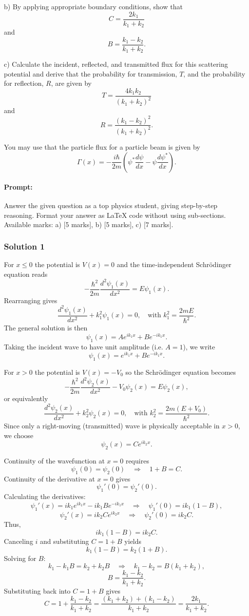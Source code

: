 \documentclass{article}
\begin{document}
b) By applying appropriate boundary conditions, show that
\[
C = \frac{2k_1}{k_1 + k_2}
\]
and
\[
B = \frac{k_1 - k_2}{k_1 + k_2}.
\]

c) Calculate the incident, reflected, and transmitted flux for this scattering potential and derive that the probability for transmission, $T$, and the probability for reflection, $R$, are given by
\[
T = \frac{4k_1k_2}{(k_1 + k_2)^2}
\]
and
\[
R = \frac{(k_1 - k_2)^2}{(k_1 + k_2)^2}.
\]

You may use that the particle flux for a particle beam is given by
\[
\Gamma(x) = -\frac{i\hbar}{2m} \left( \psi^* \frac{d\psi}{dx} - \psi \frac{d\psi^*}{dx} \right).
\]


\paragraph{Prompt: \\} 
Answer the given question as a top physics student, giving step-by-step reasoning. Format your answer as LaTeX code without using sub-sections. Available marks: a) [5 marks], b) [5 marks], c) [7 marks].

\subsubsection{Solution 1}
For \( x\le 0 \) the potential is \( V(x)=0 \) and the time‐independent Schrödinger equation reads
\[
-\frac{\hbar^2}{2m}\frac{d^2\psi_1(x)}{dx^2} = E\psi_1(x).
\]
Rearranging gives
\[
\frac{d^2\psi_1(x)}{dx^2} + k_1^2\psi_1(x)=0,\quad \text{with } k_1^2=\frac{2mE}{\hbar^2}.
\]
The general solution is then
\[
\psi_1(x)=Ae^{ik_1x}+Be^{-ik_1x}.
\]
Taking the incident wave to have unit amplitude (i.e. \(A=1\)), we write
\[
\psi_1(x)=e^{ik_1x}+Be^{-ik_1x}.
\]

For \( x>0 \) the potential is \( V(x)=-V_0 \) so the Schrödinger equation becomes
\[
-\frac{\hbar^2}{2m}\frac{d^2\psi_2(x)}{dx^2}-V_0\psi_2(x)=E\psi_2(x),
\]
or equivalently
\[
\frac{d^2\psi_2(x)}{dx^2}+k_2^2\psi_2(x)=0,\quad \text{with } k_2^2=\frac{2m(E+V_0)}{\hbar^2}.
\]
Since only a right-moving (transmitted) wave is physically acceptable in \( x>0 \), we choose
\[
\psi_2(x)=Ce^{ik_2x}.
\]

Continuity of the wavefunction at \( x=0 \) requires
\[
\psi_1(0)=\psi_2(0) \quad \Longrightarrow \quad 1+B=C.
\]
Continuity of the derivative at \( x=0 \) gives
\[
\psi_1'(0)=\psi_2'(0).
\]
Calculating the derivatives:
\[
\psi_1'(x)=ik_1e^{ik_1x}-ik_1Be^{-ik_1x}\quad \Longrightarrow \quad \psi_1'(0)=ik_1(1-B),
\]
\[
\psi_2'(x)=ik_2Ce^{ik_2x}\quad \Longrightarrow \quad \psi_2'(0)=ik_2C.
\]
Thus,
\[
ik_1(1-B)=ik_2C.
\]
Canceling \( i \) and substituting \( C=1+B \) yields
\[
k_1(1-B)=k_2(1+B).
\]
Solving for \( B \):
\[
k_1 - k_1B = k_2 + k_2B \quad \Longrightarrow \quad k_1-k_2 = B(k_1+k_2),
\]
\[
B=\frac{k_1-k_2}{k_1+k_2}.
\]
Substituting back into \( C=1+B \) gives
\[
C=1+\frac{k_1-k_2}{k_1+k_2}=\frac{(k_1+k_2)+(k_1-k_2)}{k_1+k_2}=\frac{2k_1}{k_1+k_2}.
\]
\end{document}
